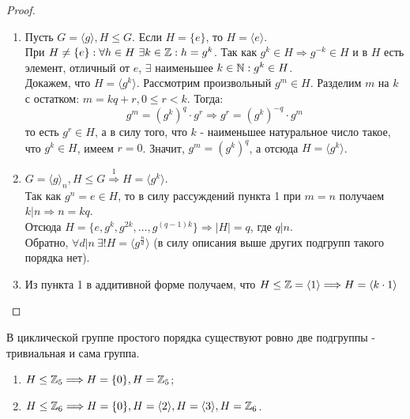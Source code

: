 \begin{proof} \tab
    \begin{enumerate}
        \item Пусть $G = \langle g \rangle, H \leq G$. Если $H = \{e\}$, то $H = \langle e \rangle$.\\
        При $H \neq \{e\} : \forall h \in H \ \exists k \in \mathbb{Z} : h = g^k$. Так как $g^k \in H \Longrightarrow g^{-k} \in H$ и в $H$ есть элемент, отличный от $e$, $\exists$ наименьшее $k \in \mathbb{N}: g^k \in H$.\\
        Докажем, что $H = \langle g^k \rangle$. Рассмотрим произвольный $g^m \in H$. Разделим $m$ на $k$ с остатком: $m = kq + r, 0 \leqslant r < k$. Тогда:
        \[g^m = (g^k)^q\cdot g^r \Longrightarrow g^r = (g^k)^{-q}\cdot g^m \]
        то есть $g^r \in H$, а в силу того, что $k$ - наименьшее натуральное число такое, что $g^k \in H$, имеем $r = 0$. Значит, $g^m = (g^k)^q$, а отсюда $H = \langle g^k \rangle$.
        \item $G =  \langle g \rangle_n, H \leq G \overset{1}{\Longrightarrow} H =  \langle g^k \rangle$.\\
        Так как $g^n = e \in H$, то в силу рассуждений пункта 1 при $m = n$ получаем $k | n \Longrightarrow n = kq$.\\
        Отсюда $H = \{e, g^k, g^{2k},...,g^{(q-1)k}\} \Longrightarrow |H| = q$, где $q | n$.\\
        Обратно, $\forall d | n \ \exists! H =  \langle g^{\frac{n}{d}} \rangle$ (в силу описания выше других подгрупп такого порядка нет).
        \item Из пункта 1 в аддитивной форме получаем, что $H \leq \mathbb{Z} =  \langle 1 \rangle \Longrightarrow H =  \langle k\cdot 1 \rangle$
    \end{enumerate} 
\end{proof}
\begin{consequense}
    В циклической группе простого порядка существуют ровно две подгруппы - тривиальная и сама группа. 
\end{consequense}
\begin{examples}\tab
    \begin{enumerate}
        \item $H \leq \mathbb{Z}_5 \Longrightarrow H = \{0\}, H = \mathbb{Z}_5$;
        \item $H \leq \mathbb{Z}_6 \Longrightarrow H = \{0\}, H = \langle 2 \rangle, H = \langle 3 \rangle, H = \mathbb{Z}_6$. 
    \end{enumerate}
\end{examples}
